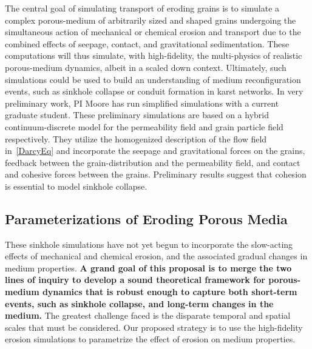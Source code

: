 \documentclass[11pt]{article}
\begin{document}
The central goal of simulating transport of eroding grains is to
simulate a complex porous-medium of arbitrarily sized and shaped grains
undergoing the simultaneous action of mechanical or chemical erosion and transport due to the combined effects of seepage, contact, and gravitational sedimentation. These computations will thus simulate, with high-fidelity, the multi-physics of realistic porous-medium dynamics, albeit in a scaled down context. Ultimately, such simulations could be used to build an understanding of medium reconfiguration events, such as sinkhole collapse or conduit formation in karst networks. In very preliminary work, PI Moore has run simplified simulations with a current graduate student. These preliminary simulations are based on a hybrid continuum-discrete model for the permeability field and grain particle field respectively. They utilize the homogenized description of the flow field in~\eqref{DarcyEq} and incorporate the seepage and gravitational forces on the grains, feedback between the grain-distribution and the permeability field, and contact and cohesive forces between the grains.  Preliminary results suggest that cohesion is essential to model sinkhole collapse.


\subsection{Parameterizations of Eroding Porous Media}
These sinkhole simulations have not yet begun to incorporate the slow-acting effects of mechanical and chemical erosion, and the associated gradual changes in medium properties. {\bf A grand goal of this proposal is to merge the two lines of inquiry to develop a sound theoretical framework for porous-medium dynamics that is robust enough to capture both short-term events, such as sinkhole collapse, and long-term changes in the medium.} The greatest challenge faced is the disparate temporal and spatial scales that must be considered. Our proposed strategy is to use the high-fidelity erosion simulations to parametrize the effect of erosion on medium properties.
\end{document}
